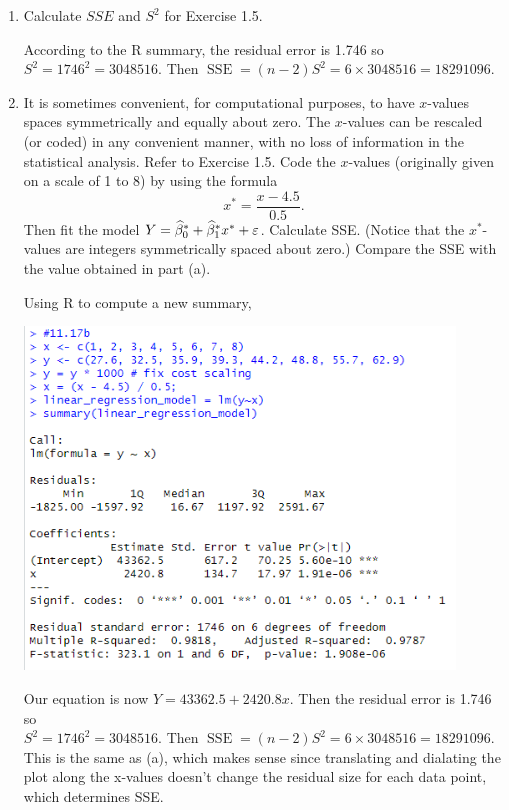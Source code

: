 \begin{enumerate}[label=\textbf{\alph*}]
    \item Calculate $SSE$ and $S^2$ for Exercise 1.5.

    \soln* According to the R summary, the residual error is 1.746 so 
    \\$S^2 = 1746^2 = 3048516$. Then $\operatorname{SSE} = (n-2)S^2 = 6 \times 3048516 = 18291096$.

    \item It is sometimes convenient, for computational purposes, to have $x$-values spaces symmetrically and equally about zero. The $x$-values can be rescaled (or coded) in any convenient manner, with no loss of information in the statistical analysis. Refer to Exercise 1.5. Code the $x$-values (originally given on a scale of 1 to 8) by using the formula $$x^{\ast} = \frac{x-4.5}{0.5}.$$ Then fit the model $Y = \widehat{\beta}_0^{\ast} + \widehat{\beta}_1^{\ast} x^{\ast} + \varepsilon$. Calculate SSE. (Notice that the $x^{\ast}$-values are integers symmetrically spaced about zero.) Compare the SSE with the value obtained in part (a).

    \soln* Using R to compute a new summary, 

    \nl \includegraphics*[width=4.5in]{img/11_17_rb.PNG}

    Our equation is now $Y = 43362.5 + 2420.8x$.
    Then the residual error is 1.746 so 
    \\$S^2 = 1746^2 = 3048516$. Then $\operatorname{SSE} = (n-2)S^2 = 6 \times 3048516 = 18291096$. This is the same as (a), which makes sense since translating and dialating the plot along the x-values doesn't change the residual size for each data point, which determines SSE.
\end{enumerate}